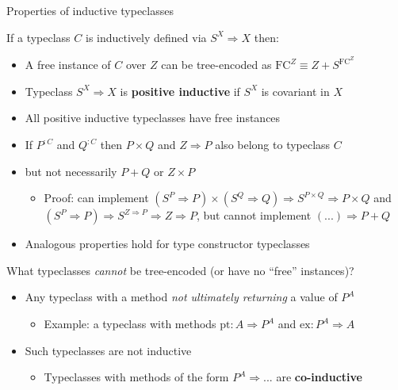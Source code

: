\documentclass[english,,russian]{beamer}
\begin{document}
\begin{frame}{Properties of inductive typeclasses}

If a typeclass $C$ is inductively defined via $S^{X}\Rightarrow X$
then:
\begin{itemize}
\item A free instance of $C$ over $Z$ can be tree-encoded as $\text{FC}^{Z}\equiv Z+S^{\text{FC}^{Z}}$
\item Typeclass $S^{X}\Rightarrow X$ is \textbf{positive inductive} if
$S^{X}$ is covariant in $X$
\item All positive inductive typeclasses have free instances
\item If $P^{:C}$ and $Q^{:C}$ then $P\times Q$ and $Z\Rightarrow P$
also belong to typeclass $C$
\item but not necessarily $P+Q$ or $Z\times P$
\begin{itemize}
\item Proof: can implement $(S^{P}\Rightarrow P)\times(S^{Q}\Rightarrow Q)\Rightarrow S^{P\times Q}\Rightarrow P\times Q$
and $\left(S^{P}\Rightarrow P\right)\Rightarrow S^{Z\Rightarrow P}\Rightarrow Z\Rightarrow P$,
but cannot implement $\left(...\right)\Rightarrow P+Q$
\end{itemize}
\item Analogous properties hold for type constructor typeclasses
\end{itemize}
What typeclasses \emph{cannot} be tree-encoded (or have no ``free''
instances)?
\begin{itemize}
\item Any typeclass with a method \emph{not ultimately returning} a value
of $P^{A}$
\begin{itemize}
\item Example: a typeclass with methods $\text{pt}:A\Rightarrow P^{A}$
and $\text{ex}:P^{A}\Rightarrow A$
\end{itemize}
\item Such typeclasses are not inductive
\begin{itemize}
\item Typeclasses with methods of the form $P^{A}\Rightarrow...$ are \textbf{co-inductive}
\end{itemize}
\end{itemize}
\end{frame}
\end{document}
